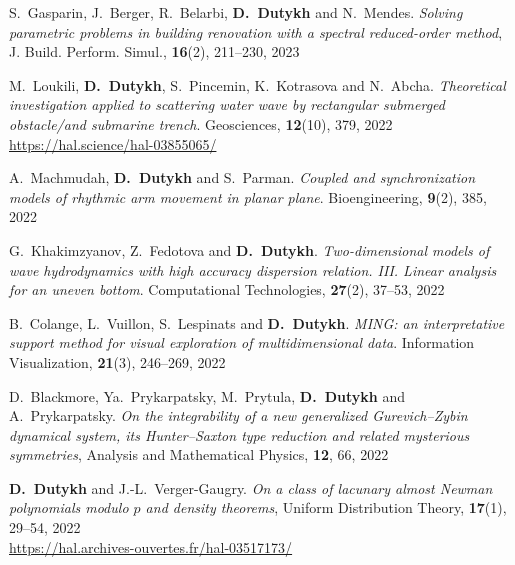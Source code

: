 \begin{etaremune}
  \item S.~Gasparin, J.~Berger, R.~Belarbi, \textbf{D.~Dutykh} and N.~Mendes. \textit{Solving parametric problems in building renovation with a spectral reduced-order method}, J. Build. Perform. Simul., \textbf{16}(2), 211--230, 2023 %


  
  \item M.~Loukili, \textbf{D.~Dutykh}, S.~Pincemin, K.~Kotrasova and N.~Abcha. \textit{Theoretical investigation applied to scattering water wave by rectangular submerged obstacle/and submarine trench}. Geosciences, \textbf{12}(10), 379, 2022 \\ %
  \url{https://hal.science/hal-03855065/}
  
  
  \item A.~Machmudah, \textbf{D.~Dutykh} and S.~Parman. \textit{Coupled and synchronization models of rhythmic arm movement in planar plane}. Bioengineering, \textbf{9}(2), 385, 2022 %
  
  \item G.~Khakimzyanov, Z.~Fedotova and \textbf{D.~Dutykh}. \textit{Two-dimensional models of wave hydrodynamics with high accuracy dispersion relation. III. Linear analysis for an uneven bottom}. Computational Technologies, \textbf{27}(2), 37--53, 2022 %
  
  \item B.~Colange, L.~Vuillon, S.~Lespinats and \textbf{D.~Dutykh}. \textit{MING: an interpretative support method for visual exploration of multidimensional data}. Information Visualization, \textbf{21}(3), 246--269, 2022 %
  
  \item D.~Blackmore, Ya.~Prykarpatsky, M.~Prytula, \textbf{D.~Dutykh} and A.~Prykarpatsky. \textit{On the integrability of a new generalized Gurevich--Zybin dynamical system, its Hunter--Saxton type reduction and related mysterious symmetries}, Analysis and Mathematical Physics, \textbf{12}, 66, 2022 %
  
  \item \textbf{D.~Dutykh} and J.-L.~Verger-Gaugry. \textit{On a class of lacunary almost Newman polynomials modulo $p$ and density theorems}, Uniform Distribution Theory, \textbf{17}(1), 29--54, 2022 \\ %
  \url{https://hal.archives-ouvertes.fr/hal-03517173/}
  

\end{etaremune}
